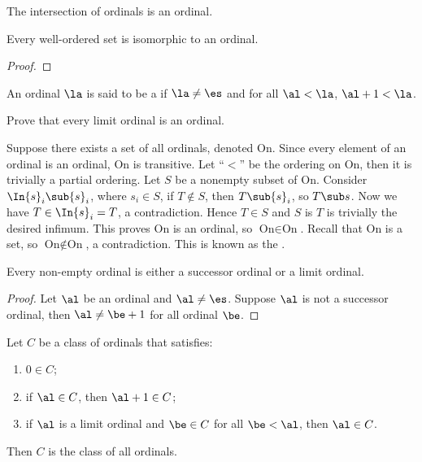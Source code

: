 \documentclass[10pt]{article}
\begin{document}
\begin{problem}
    The intersection of ordinals is an ordinal.
\end{problem}
\begin{proposition}
    Every well-ordered set is isomorphic to an ordinal.
\end{proposition}
\begin{proof}
    
\end{proof}
\begin{definition}
    An ordinal $\la$ is said to be a  if $\la\ne\es$ and for all $\al<\la$, $\al+1<\la$.
\end{definition}
\begin{problem}
    Prove that every limit ordinal is an ordinal.
\end{problem}
\par
Suppose there exists a set of all ordinals, denoted $\text{On}$. Since every element of an ordinal is an ordinal, $\text{On}$ is transitive. Let ``$<$'' be the ordering on $\text{On}$, then it is trivially a partial ordering. Let $S$ be a nonempty subset of $\text{On}$. Consider $\In{s}_{i}\sub{s}_{i}$, where ${s}_{i}\in S$, if $T\notin S$, then $T\sub{s}_{i}$, so $T\sub s$. Now we have $T\in\In{s}_{i}=T$, a contradiction. Hence $T\in S$ and $S$ is $T$ is trivially the desired infimum. This proves $\text{On}$ is an ordinal, so $\text{On}\in\text{On}$. Recall that $\text{On}$ is a set, so $\text{On}\notin\text{On}$, a contradiction. This is known as the .
\begin{proposition}
    Every non-empty ordinal is either a successor ordinal or a limit ordinal.
\end{proposition}
\begin{proof}
    Let $\al$ be an ordinal and $\al\ne\es$. Suppose $\al$ is not a successor ordinal, then $\al\ne\be+1$ for all ordinal $\be$.
\end{proof}
\begin{theorem}
    Let $C$ be a class of ordinals that satisfies:
    \begin{enumerate}
        \item $0\in C$;
        \item if $\al\in C$, then $\al+1\in C$;
        \item if $\al$ is a limit ordinal and $\be\in C$ for all $\be<\al$, then $\al\in C$.
    \end{enumerate}
    Then $C$ is the class of all ordinals.
\end{theorem}
\end{document}
